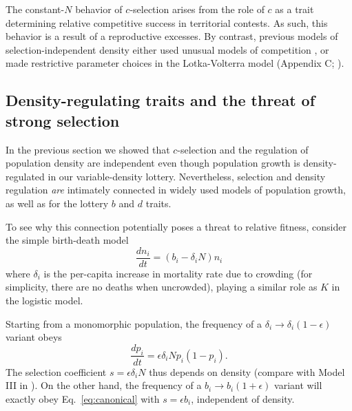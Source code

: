\documentclass[12pt]{article}
\begin{document}
The constant-$N$ behavior of $c$-selection arises from the role of $c$ as a trait determining relative competitive success in territorial contests. As such, this behavior is a result of a reproductive excesses. By contrast, previous models of selection-independent density either used unusual models of competition \citep{kimura1969natural,nei1971fertility}, or made restrictive parameter choices in the Lotka-Volterra model (Appendix C; \citealt{smouse_1976,mallet_2012}). 

\subsection*{Density-regulating traits and the threat of strong selection}

In the previous section we showed that $c$-selection and the regulation of population density are independent even though population growth is density-regulated in our variable-density lottery. Nevertheless, selection and density regulation \textit{are} intimately connected in widely used models of population growth, as well as for the lottery $b$ and $d$ traits.

To see why this connection potentially poses a threat to relative fitness, consider the simple birth-death model \cite[pp. 20]{kostitzin_1939} \citep{travis_2013} 
\begin{equation}
\frac{d n_i}{dt}=(b_i -\delta_iN) n_i \label{eq:simplebirthdeath}
\end{equation}
where $\delta_i$ is the per-capita increase in mortality rate due to crowding (for simplicity, there are no deaths when uncrowded), playing a similar role as $K$ in the logistic model. 

Starting from a monomorphic population, the frequency of a $\delta_i\rightarrow \delta_i(1-\epsilon)$ variant obeys 
\begin{equation}
\frac{d p_i}{dt}=\epsilon \delta_i N p_i(1-p_i). \label{eq:Ndependentsweep}
\end{equation}
The selection coefficient $s=\epsilon \delta_i N$ thus depends on density (compare with Model III in \cite{kimura1969natural}). On the other hand, the frequency of a $b_i\rightarrow b_i(1+\epsilon)$ variant will exactly obey Eq.~\eqref{eq:canonical} with $s=\epsilon b_i$, independent of density.
\end{document}
